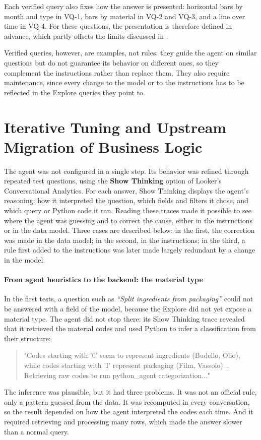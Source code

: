 Each verified query also fixes how the answer is presented: horizontal bars by month and type in VQ-1, bars by material in VQ-2 and VQ-3, and a line over time in VQ-4. For these questions, the presentation is therefore defined in advance, which partly offsets the limits discussed in .

Verified queries, however, are examples, not rules: they guide the agent on similar questions but do not guarantee its behavior on different ones, so they complement the instructions rather than replace them. They also require maintenance, since every change to the model or to the instructions has to be reflected in the Explore queries they point to.

\section[Iterative Tuning of the Agent]{Iterative Tuning and Upstream Migration of Business Logic}
\label{sec:tuning_and_migration}

The agent was not configured in a single step. Its behavior was refined through repeated test questions, using the \textbf{Show Thinking} option of Looker's Conversational Analytics. For each answer, Show Thinking displays the agent's reasoning: how it interpreted the question, which fields and filters it chose, and which query or Python code it ran. Reading these traces made it possible to see where the agent was guessing and to correct the cause, either in the instructions or in the data model. Three cases are described below: in the first, the correction was made in the data model; in the second, in the instructions; in the third, a rule first added to the instructions was later made largely redundant by a change in the model.

\paragraph{From agent heuristics to the backend: the material type}
In the first tests, a question such as \textit{``Split ingredients from packaging''} could not be answered with a field of the model, because the Explore did not yet expose a material type. The agent did not stop there: its Show Thinking trace revealed that it retrieved the material codes and used Python to infer a classification from their structure:
\begin{quote}
{\small\ttfamily\raggedright "Codes starting with '0' seem to represent ingredients (Budello, Olio), while codes starting with 'I' represent packaging (Film, Vassoio)... Retrieving raw codes to run python\_agent categorization..."\par}
\end{quote}
The inference was plausible, but it had three problems. It was not an official rule, only a pattern guessed from the data. It was recomputed in every conversation, so the result depended on how the agent interpreted the codes each time. And it required retrieving and processing many rows, which made the answer slower than a normal query.

